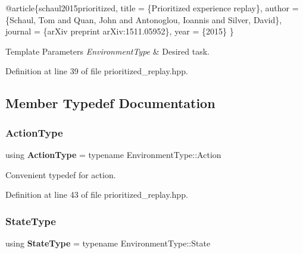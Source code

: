 \begin{DoxyCode}
@article\{schaul2015prioritized,
 title   = \{Prioritized experience replay\},
 author  = \{Schaul, Tom and Quan, John and Antonoglou,
            Ioannis and Silver, David\},
 journal = \{arXiv preprint arXiv:1511.05952\},
 year    = \{2015\}
 \}
\end{DoxyCode}



\begin{DoxyTemplParams}{Template Parameters}
{\em Environment\+Type} & Desired task. \\
\hline
\end{DoxyTemplParams}


Definition at line 39 of file prioritized\+\_\+replay.\+hpp.



\subsection{Member Typedef Documentation}
\mbox{\label{classmlpack_1_1rl_1_1PrioritizedReplay_aaf7b2dc5d49d01961601c7c16be76777}} 
\subsubsection{Action\+Type}
{\footnotesize\ttfamily using \textbf{ Action\+Type} =  typename Environment\+Type\+::\+Action}



Convenient typedef for action. 



Definition at line 43 of file prioritized\+\_\+replay.\+hpp.

\mbox{\label{classmlpack_1_1rl_1_1PrioritizedReplay_ada68ef405b7c331a2bee337614f00088}} 
\subsubsection{State\+Type}
{\footnotesize\ttfamily using \textbf{ State\+Type} =  typename Environment\+Type\+::\+State}




